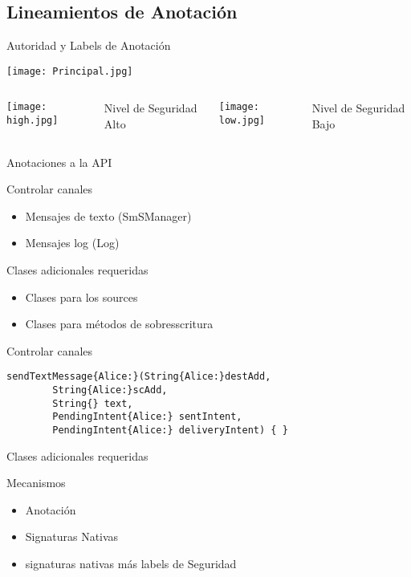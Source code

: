 \subsection{Lineamientos de Anotación} 
\begin{frame}{Autoridad y Labels de Anotación}
	\begin{center}
	\texttt{[image: Principal.jpg]}
	\end{center}
	\begin{columns}[c]
	\column{1.5in}
	\begin{center}
	\texttt{[image: high.jpg]}
	\end{center}
	Nivel de Seguridad Alto
	\column{1.5in}
	\begin{center} 
	\texttt{[image: low.jpg]}
	\end{center}
	Nivel de Seguridad Bajo\newline
	\end{columns}
\end{frame}	
\begin{frame}{Anotaciones a la API} %
	\begin{block}{Controlar canales} 
	\begin{itemize}
	  \item Mensajes de texto (SmSManager)
	  \item Mensajes log (Log)
	\end{itemize} 
	\end{block}
	\begin{block}{Clases adicionales requeridas}
		\begin{itemize}
		  \item Clases para los sources
		  \item Clases para métodos de sobresscritura
		\end{itemize}
	\end{block}
\end{frame}	
\begin{frame}[fragile]{Controlar canales}
\begin{lstlisting}
sendTextMessage{Alice:}(String{Alice:}destAdd, 
		String{Alice:}scAdd, 
		String{} text,
	    PendingIntent{Alice:} sentIntent,
		PendingIntent{Alice:} deliveryIntent) { }
\end{lstlisting}
\end{frame}
\begin{frame}{Clases adicionales requeridas}
	\begin{block}{Mecanismos}
		\begin{itemize}
		  \item Anotación
		  \item Signaturas Nativas
		  \item signaturas nativas más labels de Seguridad
		\end{itemize}
	\end{block}
\end{frame}

